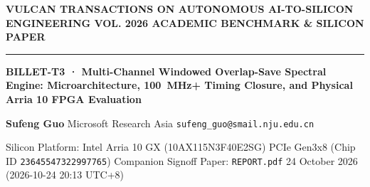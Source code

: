 \documentclass[11pt,a4paper]{article}
\begin{document}
{\scriptsize\sffamily\textcolor{vulcan}{\textbf{VULCAN TRANSACTIONS ON AUTONOMOUS AI-TO-SILICON ENGINEERING \hfill VOL. 2026 \textperiodcentered{} ACADEMIC BENCHMARK \& SILICON PAPER}}\par}

\vspace{1pt}\textcolor{vulcan}{\rule{\textwidth}{1.2pt}}\vspace{3pt}

\begin{center}

{\sffamily\LARGE\bfseries BILLET-T3 · Multi-Channel Windowed Overlap-Save Spectral Engine: Microarchitecture, 100~MHz+ Timing Closure, and Physical Arria 10 FPGA Evaluation\par}\vspace{3pt}

{\small\sffamily\textbf{Sufeng Guo} \textperiodcentered{} Microsoft Research Asia \textperiodcentered{} \texttt{sufeng\_guo@smail.nju.edu.cn}\par}\vspace{1pt}

{\scriptsize\sffamily\textcolor{black!75}{Silicon Platform: Intel Arria 10 GX (\allowbreak{}10AX115N3F40E2SG)\allowbreak{} PCIe Gen3x8 (Chip ID \texttt{23645547322997765}) \textperiodcentered{} Companion Signoff Paper: \texttt{REPORT.pdf} \textperiodcentered{} 24 October 2026 (\allowbreak{}2026-10-24 20:13 UTC+\allowbreak{}8)\allowbreak{}}\par}

\end{center}\vspace{2pt}
\end{document}
